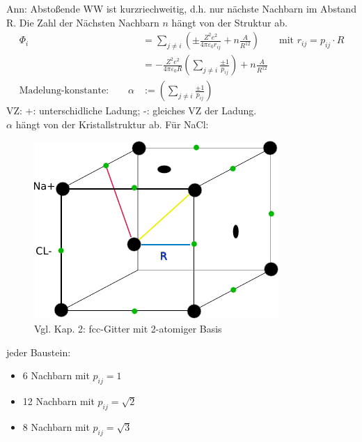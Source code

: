 	Ann: Abstoßende WW ist kurzriechweitig, d.h. nur nächste Nachbarn im Abstand R. Die Zahl der Nächsten Nachbarn $n$ hängt von der Struktur ab.
	\begin{align*}
		\Phi_i                                   & = \sum_{j \neq i} \left(\pm \frac{Z^2 e^2}{4 \pi \varepsilon_0 r_{ij}} + n\frac{A}{R^{12}}\right)
		\qquad \text{mit } r_{ij} = p_{ij} \cdot R                                                                                                                 \\
												& = - \frac{Z^2 e^2}{4 \pi \varepsilon_0 R} \left(\sum_{j \neq i} \frac{\pm 1}{p_{ij}}\right) + n\frac{A}{R^{12}} \\
		\text{Madelung-konstante:} \qquad \alpha & := \left(\sum_{j \neq i} \frac{\pm 1}{p_{ij}}\right)
	\end{align*}
	VZ: +: unterschidliche Ladung; -: gleiches VZ der Ladung.\\
	$\alpha$ hängt von der Kristallstruktur ab. Für NaCl:
	\begin{figure}
		\centering
		\includegraphics{figures/1_3NaCl.pdf}
		\caption{Vgl. Kap. 2: fcc-Gitter mit 2-atomiger Basis}
	\end{figure}
	jeder Baustein:
	\begin{itemize}
		\item 6 Nachbarn mit $p_{ij} =  1$
		\item 12 Nachbarn mit $p_{ij} =  \sqrt{2}$
		\item 8 Nachbarn mit $p_{ij} =  \sqrt{3}$
	\end{itemize}

